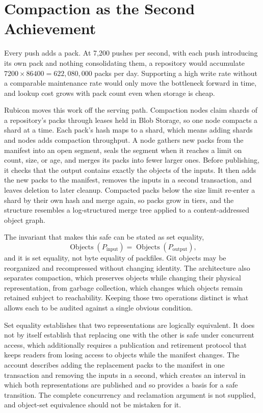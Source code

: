 \documentclass[11pt]{article}
\theoremstyle{definition}
\theoremstyle{plain}
\begin{document}
\section{Compaction as the Second Achievement}

Every push adds a pack. At 7,200 pushes per second, with each push introducing its own pack and nothing consolidating them, a repository would accumulate $7200\times 86400 = 622{,}080{,}000$ packs per day. Supporting a high write rate without a comparable maintenance rate would only move the bottleneck forward in time, and lookup cost grows with pack count even when storage is cheap.

Rubicon moves this work off the serving path. Compaction nodes claim shards of a repository's packs through leases held in Blob Storage, so one node compacts a shard at a time. Each pack's hash maps to a shard, which means adding shards and nodes adds compaction throughput. A node gathers new packs from the manifest into an open segment, seals the segment when it reaches a limit on count, size, or age, and merges its packs into fewer larger ones. Before publishing, it checks that the output contains exactly the objects of the inputs. It then adds the new packs to the manifest, removes the inputs in a second transaction, and leaves deletion to later cleanup. Compacted packs below the size limit re-enter a shard by their own hash and merge again, so packs grow in tiers, and the structure resembles a log-structured merge tree \cite{oneil1996} applied to a content-addressed object graph.

The invariant that makes this safe can be stated as set equality,
\[
\operatorname{Objects}(P_{\mathrm{input}})=\operatorname{Objects}(P_{\mathrm{output}}),
\]
and it is set equality, not byte equality of packfiles. Git objects may be reorganized and recompressed without changing identity. The architecture also separates compaction, which preserves objects while changing their physical representation, from garbage collection, which changes which objects remain retained subject to reachability. Keeping those two operations distinct is what allows each to be audited against a single obvious condition.

Set equality establishes that two representations are logically equivalent. It does not by itself establish that replacing one with the other is safe under concurrent access, which additionally requires a publication and retirement protocol that keeps readers from losing access to objects while the manifest changes. The account describes adding the replacement packs to the manifest in one transaction and removing the inputs in a second, which creates an interval in which both representations are published and so provides a basis for a safe transition. The complete concurrency and reclamation argument is not supplied, and object-set equivalence should not be mistaken for it.
\end{document}
